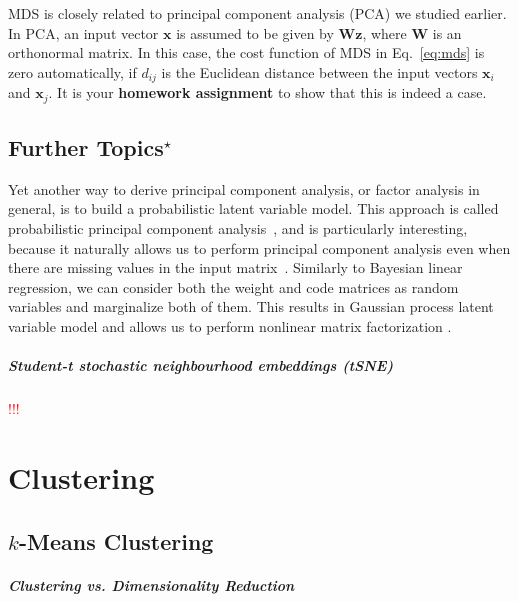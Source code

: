 \documentclass{report}
\newcommand{\vect}[1]{\mathbf{#1}}
\newcommand{\matr}[1]{\mathbf{#1}}
\newcommand{\vx}[0]{\vect{x}}
\newcommand{\vz}[0]{\vect{z}}
\newcommand{\mW}[0]{\matr{W}}
\newcommand{\todo}[1]{{\Large\textcolor{red}{#1}}}
\begin{document}
MDS is closely related to principal component analysis (PCA) we studied earlier.
In PCA, an input vector $\vx$ is assumed to be given by $\mW \vz$, where $\mW$
is an orthonormal matrix. In this case, the cost function of MDS in
Eq.~\eqref{eq:mds} is zero automatically, if $d_{ij}$ is the Euclidean distance
between the input vectors $\vx_i$ and $\vx_j$. It is your {\bf homework
assignment} to show that this is indeed a case. 


\section{Further Topics$^\star$}

Yet another way to derive principal component analysis, or factor analysis in
general, is to build a probabilistic latent variable model. This approach is
called probabilistic principal component
analysis~\cite{roweis1998algorithms,tipping1999probabilistic}, and is
particularly interesting, because it naturally allows us to perform principal
component analysis even when there are missing values in the input
matrix~\cite{ilin2010practical,salakhutdinov2007probabilistic}. Similarly to
Bayesian linear regression, we can consider both the weight and code matrices as
random variables and marginalize both of them. This results in Gaussian process
latent variable model and allows us to perform nonlinear matrix factorization
\cite{lawrence2004gaussian}. 




\paragraph{Student-t stochastic neighbourhood embeddings (tSNE)}

\todo{!!!}




\chapter{Clustering}
\label{sec:cluster}

\section{$k$-Means Clustering}

\paragraph{Clustering vs. Dimensionality Reduction}
\end{document}
